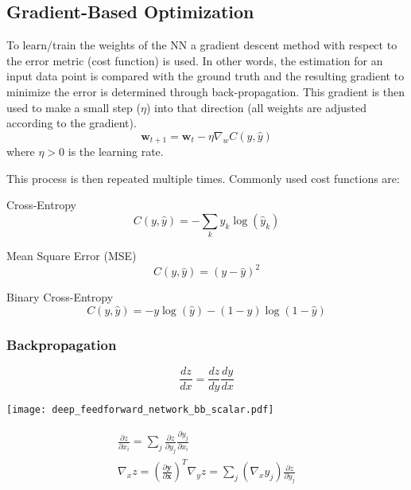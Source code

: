 \renewcommand{\arraystretch}{1}
\setlength\tabcolsep{\oldtabcolsep}

\subsection{Gradient-Based Optimization}

To learn/train the weights of the NN a gradient descent method with respect to the error metric (cost function) is used. In other words, the estimation for an input data point is compared with the ground truth and the resulting gradient to minimize the error is determined through back-propagation. This gradient is then used to make a small step ($\eta$) into that direction (all weights are adjusted according to the gradient).
\begin{equation*}
    \mathbf{w}_{t+1} = \mathbf{w}_t - \eta \nabla_w C(y,\hat{y})
\end{equation*}
where $\eta > 0$ is the learning rate.

This process is then repeated multiple times.
\newpar{}
Commonly used cost functions are:

Cross-Entropy
\begin{equation*}
    C(y,\hat{y}) = - \sum_{k}y_k\log(\hat{y}_k)
\end{equation*}

Mean Square Error (MSE)
\begin{equation*}
    C(y,\hat{y}) = {(y - \hat{y})}^2
\end{equation*}

Binary Cross-Entropy
\begin{equation*}
    C(y,\hat{y}) = -y\log(\hat{y})-(1-y)\log(1-\hat{y})
\end{equation*}

\subsubsection{Backpropagation}

\begin{equation*}
    \frac{dz}{dx} = \frac{dz}{dy}\frac{dy}{dx}
\end{equation*}

\begin{center}
    \texttt{[image: deep\_feedforward\_network\_bb\_scalar.pdf]}
\end{center}

\begin{gather*}
    \frac{\partial z}{\partial x_i} = \sum_{j}\frac{\partial z}{\partial y_j}\frac{\partial y_j}{\partial x_i} \\
    \nabla_x z = {\left(\frac{\partial \mathbf{y}}{\partial \mathbf{x}}\right)}^T \nabla_y z = \sum_{j}(\nabla_x y_j)\frac{\partial z}{\partial y_j}
\end{gather*}

